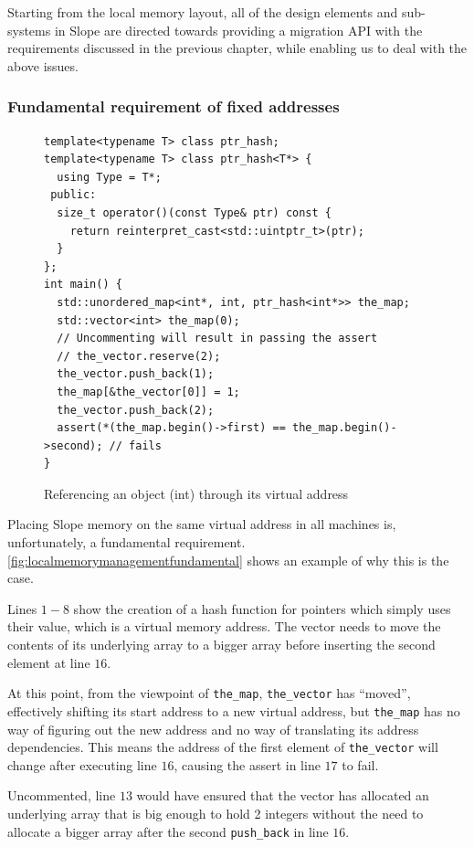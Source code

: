 Starting from the local memory layout, all of the design elements and
sub-systems in Slope are directed towards providing a migration API with the
requirements discussed in the previous chapter, while enabling us to deal with
the above
issues.


\subsubsection{Fundamental requirement of fixed addresses}
\label{sec:fixedfundamental}
\begin{figure}[tp]
\begin{lstlisting}
template<typename T> class ptr_hash;
template<typename T> class ptr_hash<T*> {
  using Type = T*;
 public:
  size_t operator()(const Type& ptr) const {
    return reinterpret_cast<std::uintptr_t>(ptr);
  }
};
int main() {
  std::unordered_map<int*, int, ptr_hash<int*>> the_map;
  std::vector<int> the_map(0);
  // Uncommenting will result in passing the assert
  // the_vector.reserve(2);
  the_vector.push_back(1);
  the_map[&the_vector[0]] = 1;
  the_vector.push_back(2);
  assert(*(the_map.begin()->first) == the_map.begin()->second); // fails
}
\end{lstlisting}
\caption{
    Referencing an object (int) through its virtual address
}
\label{fig:localmemorymanagementfundamental}
\end{figure}




Placing Slope memory on the same virtual address in all machines is,
unfortunately, a fundamental requirement. \autoref{fig:localmemorymanagementfundamental}
shows an example of why this is the case.

Lines $1-8$ show the creation of a hash
    function for pointers which simply uses their value, which is a virtual
    memory address. The vector needs to move the contents of its underlying
    array to a bigger array before inserting the second element at line $16$.

    At this point, from the viewpoint of
    \texttt{the\_map}, \texttt{the\_vector} has ``moved'', effectively shifting its start
    address to a new virtual address, but \texttt{the\_map} has no way of figuring out
    the new address and no way of translating its address dependencies.
    This means the address of the first element of \texttt{the\_vector} will
    change after executing line $16$, causing the assert in line $17$ to
    fail.

Uncommented, line $13$ would have ensured that the vector has
    allocated an underlying array that is big enough to hold 2 integers without
    the need to allocate a bigger array after the second \texttt{push\_back} in
    line $16$.






